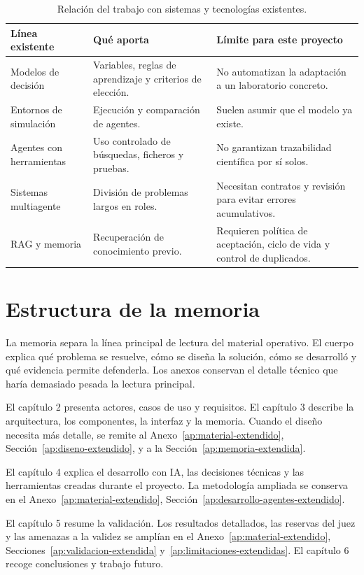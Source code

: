 \begin{table}[H]
\begin{center}
\small
\begin{tabular}{|p{3.4cm}|p{4.2cm}|p{4.6cm}|} \hline
\textbf{Línea existente} & \textbf{Qué aporta} & \textbf{Límite para este proyecto} \\ \hline
Modelos de decisión & Variables, reglas de aprendizaje y criterios de elección. & No automatizan la adaptación a un laboratorio concreto. \\ \hline
Entornos de simulación & Ejecución y comparación de agentes. & Suelen asumir que el modelo ya existe. \\ \hline
Agentes con herramientas & Uso controlado de búsquedas, ficheros y pruebas. & No garantizan trazabilidad científica por sí solos. \\ \hline
Sistemas multiagente & División de problemas largos en roles. & Necesitan contratos y revisión para evitar errores acumulativos. \\ \hline
RAG y memoria & Recuperación de conocimiento previo. & Requieren política de aceptación, ciclo de vida y control de duplicados. \\ \hline
\end{tabular}
\caption{Relación del trabajo con sistemas y tecnologías existentes.}
\end{center}
\end{table}

\section{Estructura de la memoria}

La memoria separa la línea principal de lectura del material operativo. El
cuerpo explica qué problema se resuelve, cómo se diseña la solución, cómo se
desarrolló y qué evidencia permite defenderla. Los anexos conservan el detalle
técnico que haría demasiado pesada la lectura principal.

El capítulo 2 presenta actores, casos de uso y requisitos. El capítulo 3
describe la arquitectura, los componentes, la interfaz y la memoria. Cuando el
diseño necesita más detalle, se remite al Anexo~\ref{ap:material-extendido},
Sección~\ref{ap:diseno-extendido}, y a la Sección~\ref{ap:memoria-extendida}.

El capítulo 4 explica el desarrollo con IA, las decisiones técnicas y las
herramientas creadas durante el proyecto. La metodología ampliada se conserva
en el Anexo~\ref{ap:material-extendido}, Sección~\ref{ap:desarrollo-agentes-extendido}.

El capítulo 5 resume la validación. Los resultados detallados, las reservas del
juez y las amenazas a la validez se amplían en el
Anexo~\ref{ap:material-extendido}, Secciones~\ref{ap:validacion-extendida}
y~\ref{ap:limitaciones-extendidas}. El capítulo 6 recoge conclusiones y trabajo
futuro.
